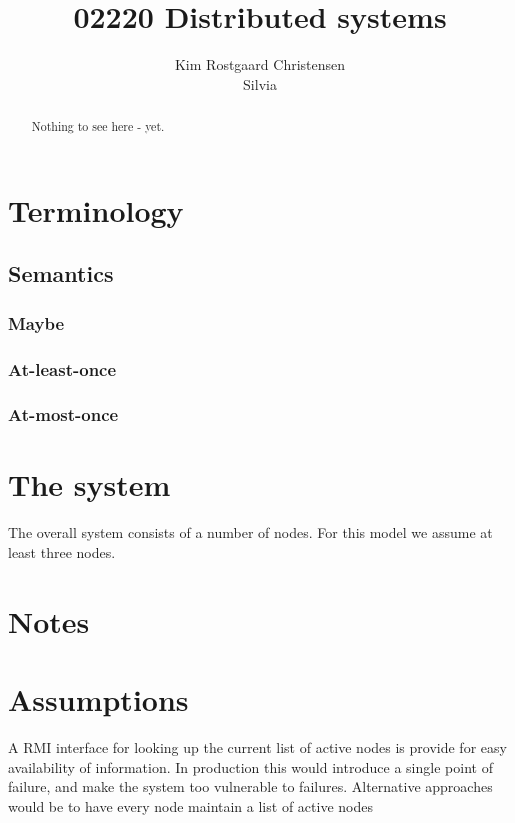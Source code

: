 \documentclass[10pt,a4paper]{article}
\begin{document}
\def\File#1{\textsf{#1}}
\def\Code#1{\texttt{#1}}
\def\Key#1{\textsf{#1}}

\title{02220 Distributed systems}
\author{Kim Rostgaard Christensen \\ Silvia}

\maketitle

\tableofcontents

\begin{abstract}
Nothing to see here - yet.
\end{abstract}

\section{Terminology}

\subsection{Semantics}

\subsubsection{Maybe}
\subsubsection{At-least-once}
\subsubsection{At-most-once}

\section{The system}

The overall system consists of a number of nodes. For this model we assume at least three nodes.

\section{Notes}

\section{Assumptions}
A RMI interface for looking up the current list of active nodes is provide for easy availability of information. In production this would introduce a single point of failure, and make the system too vulnerable to failures.
Alternative approaches would be to have every node maintain a list of active nodes
\end{document}
